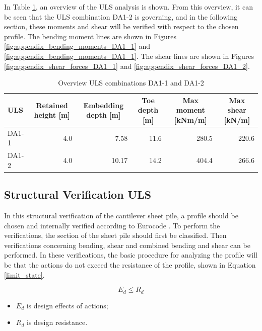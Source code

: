 In Table \ref{tab:uls_summary}, an overview of the ULS analysis is shown. From this overview, it can be seen that the ULS combination DA1-2 is governing, and in the following section, these moments and shear will be verified with respect to the chosen profile. The bending moment lines are shown in Figures \ref{fig:appendix_bending_moments_DA1_1} and \ref{fig:appendix_bending_moments_DA1_1}. The shear lines are shown in Figures \ref{fig:appendix_shear_forces_DA1_1} and \ref{fig:appendix_shear_forces_DA1_2}.

\begin{table}[H]
  \centering
  \caption{Overview ULS combinations DA1-1 and DA1-2}
  \label{tab:uls_summary}
  \small
  \setlength{\tabcolsep}{8pt}
  \renewcommand{\arraystretch}{1.15}
  \begin{tabular}{@{}l r r r r r@{}}
    \toprule
    ULS & \multicolumn{1}{c}{Retained height [m]} & \multicolumn{1}{c}{Embedding depth [m]} & \multicolumn{1}{c}{Toe depth [m]} & \multicolumn{1}{c}{Max moment [kNm/m]} & \multicolumn{1}{c}{Max shear [kN/m]} \\
    \midrule
    DA1-1   & 4.0 & 7.58 & 11.6 & 280.5 & 220.6 \\
    DA1-2  & 4.0 & 10.17 & 14.2 & 404.4 & 266.6 \\
    \bottomrule
  \end{tabular}
\end{table}

\newpage

\subsection{Structural Verification ULS}
\label{section:structural_verification_uls}

In this structural verification of the cantilever sheet pile, a profile should be chosen and internally verified according to Eurocode \autocite{eurocodeEurocode3Design2007}. To perform the verifications, the section of the sheet pile should first be classified. Then verifications concerning bending, shear and combined bending and shear can be performed. In these verifications, the basic procedure for analyzing the profile will be that the actions do not exceed the resistance of the profile, shown in Equation \ref{limit_state}.

\begin{equation}
    E_{d} \leq R_{d}
    \label{limit_state}
\end{equation}

\begin{itemize}
    \item $E_{d}$ is design effects of actions;
    \item $R_{d}$ is design resistance.
\end{itemize}

